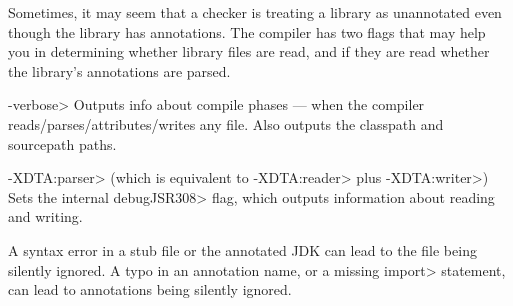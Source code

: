 
Sometimes, it may seem that a checker is treating a library as unannotated
even though the library has annotations.  The compiler has two flags that
may help you in determining whether library files are read, and if they are
read whether the library's annotations are parsed.

\begin{description}
\item \<-verbose>
  Outputs info about compile phases --- when the compiler
  reads/parses/attributes/writes any file.  Also outputs the classpath and
  sourcepath paths.
\item \<-XDTA:parser> (which is equivalent to \<-XDTA:reader> plus \<-XDTA:writer>)
  Sets the internal \<debugJSR308> flag, which outputs information about
  reading and writing.
\end{description}

A syntax error in a stub file or the annotated JDK can lead to the file
being silently ignored.  A typo in an annotation name, or a missing
\<import> statement, can lead to annotations being silently ignored.


